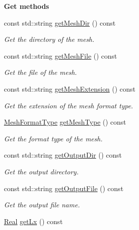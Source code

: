 \begin{Indent}{\bf Get methods}\par
\begin{DoxyCompactItemize}
\item 
const std\+::string \hyperlink{classFVCode3D_1_1Data_a0b2af9e0ccfdb43c90078a475c5adfea}{get\+Mesh\+Dir} () const 
\begin{DoxyCompactList}\small\item\em Get the directory of the mesh. \end{DoxyCompactList}\item 
const std\+::string \hyperlink{classFVCode3D_1_1Data_a4647d475e08623c9802b61871640c1f7}{get\+Mesh\+File} () const 
\begin{DoxyCompactList}\small\item\em Get the file of the mesh. \end{DoxyCompactList}\item 
const std\+::string \hyperlink{classFVCode3D_1_1Data_ab688ed7327553bca040e93d36e14e401}{get\+Mesh\+Extension} () const 
\begin{DoxyCompactList}\small\item\em Get the extension of the mesh format type. \end{DoxyCompactList}\item 
\hyperlink{classFVCode3D_1_1Data_a6a9aa6abc2ca3c85be8578d82a61a9c6}{Mesh\+Format\+Type} \hyperlink{classFVCode3D_1_1Data_a25dced9c98efcb446cc262b09e7eba80}{get\+Mesh\+Type} () const 
\begin{DoxyCompactList}\small\item\em Get the format type of the mesh. \end{DoxyCompactList}\item 
const std\+::string \hyperlink{classFVCode3D_1_1Data_a598ba33b37f0b64b4bc598ad19660a3d}{get\+Output\+Dir} () const 
\begin{DoxyCompactList}\small\item\em Get the output directory. \end{DoxyCompactList}\item 
const std\+::string \hyperlink{classFVCode3D_1_1Data_aa4dab1fc14e725f953177b391094222d}{get\+Output\+File} () const 
\begin{DoxyCompactList}\small\item\em Get the output file name. \end{DoxyCompactList}\item 
\hyperlink{namespaceFVCode3D_a40c1f5588a248569d80aa5f867080e83}{Real} \hyperlink{classFVCode3D_1_1Data_a5e6e9fd93fa4aa0c43bca2d4d4615e9b}{get\+Lx} () const 

\end{DoxyCompactItemize}
\end{Indent}
